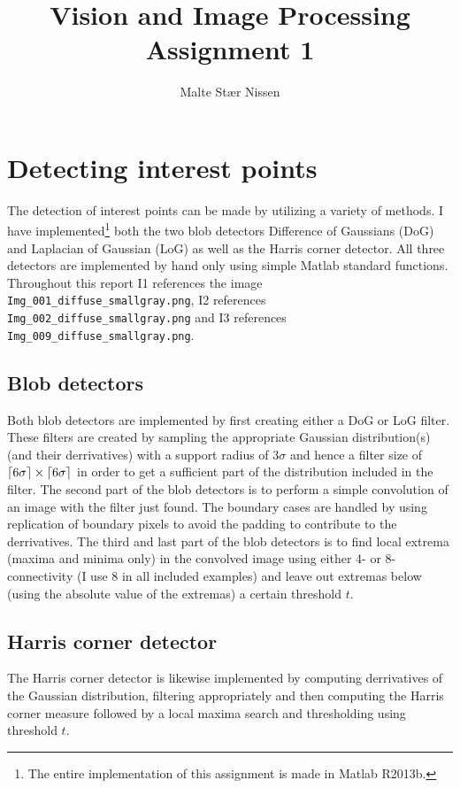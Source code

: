 \documentclass[11pt,a4paper]{article}
\title{Vision and Image Processing\\Assignment 1}
\author{Malte Stær Nissen}
\DeclarePairedDelimiter{\ceil}{\lceil}{\rceil}
\begin{document}
\maketitle

\section{Detecting interest points}
The detection of interest points can be made by utilizing a variety of methods. I
have implemented\footnote{The entire implementation of this assignment is made
in Matlab R2013b.} both the two blob detectors Difference of Gaussians (DoG) and
Laplacian of Gaussian (LoG) as well as the Harris corner detector. All three detectors
are implemented by hand only using simple Matlab standard functions.
Throughout this report I1 references the image
\texttt{Img\_001\_diffuse\_smallgray.png}, I2 references
\texttt{Img\_002\_diffuse\_smallgray.png} and I3 references
\texttt{Img\_009\_diffuse\_smallgray.png}.

\subsection{Blob detectors}
Both blob detectors are implemented by first creating either a DoG or LoG
filter. These filters are created by sampling the appropriate Gaussian
distribution(s) (and their derrivatives) with a support radius of $3\sigma$
and hence a filter size of $\ceil{6 \sigma} \times \ceil{6\sigma}$ in order to
get a sufficient part of the distribution included in the filter. The second
part of the blob detectors is to perform a simple convolution of an image with
the filter just found. The boundary cases are handled by using replication of
boundary pixels to avoid the padding to contribute to the derrivatives. The
third and last part of the blob detectors is to find local extrema (maxima and
minima only) in the convolved image using either 4- or 8-connectivity (I use
8 in all included examples) and leave out extremas below (using the absolute
value of the extremas) a certain threshold $t$.

\subsection{Harris corner detector}
The Harris corner detector is likewise implemented by computing derrivatives
of the Gaussian distribution, filtering appropriately and then computing the
Harris corner measure followed by a local maxima search and thresholding using
threshold $t$.
\end{document}
